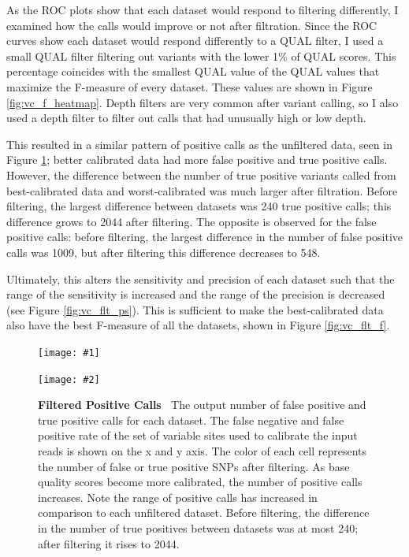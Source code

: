 \documentclass{report}
\newcommand{\titlecaption}[2]{\caption[#1]{\textbf{#1 \textbar\,} #2}}
\newcommand{\includetwo}[2]{\begin{minipage}{.475\textwidth}%
\texttt{[image: \#1]}%
\end{minipage}\hfill\begin{minipage}{.475\textwidth}%
\texttt{[image: \#2]}%
\end{minipage}}
\begin{document}
\begin{outline}
\item As the ROC plots show that each dataset would respond to filtering differently, I examined how the calls would improve or not after filtration. Since the ROC curves show each dataset would respond differently to a QUAL filter, I used a small QUAL filter filtering out variants with the lower 1\% of QUAL scores. This percentage coincides with the smallest QUAL value of the QUAL values that maximize the F-measure of every dataset. These values are shown in Figure \ref{fig:vc_f_heatmap}. Depth filters are very common after variant calling, so I also used a depth filter to filter out calls that had unusually high or low depth.
\item This resulted in a similar pattern of positive calls as the unfiltered data, seen in Figure \ref{fig:vc_flt_p}; better calibrated data had more false positive and true positive calls. However, the difference between the number of true positive variants called from best-calibrated data and worst-calibrated was much larger after filtration. Before filtering, the largest difference between datasets was 240 true positive calls; this difference grows to 2044 after filtering. The opposite is observed for the false positive calls: before filtering, the largest difference in the number of false positive calls was 1009, but after filtering this difference decreases to 548. 
\item Ultimately, this alters the sensitivity and precision of each dataset such that the range of the sensitivity is increased and the range of the precision is decreased (see Figure \ref{fig:vc_flt_ps}). This is sufficient to make the best-calibrated data also have the best F-measure of all the datasets, shown in Figure \ref{fig:vc_flt_f}.
\end{outline}

\begin{figure}
\centering
\includetwo{flt_fp_heatmap.pdf}{flt_tp_heatmap.pdf}
\titlecaption{Filtered Positive Calls}{The output number of false positive and true positive calls for each dataset. The false negative and false positive rate of the set of variable sites used to calibrate the input reads is shown on the x and y axis. The color of each cell represents the number of false or true positive SNPs after filtering. As base quality scores become more calibrated, the number of positive calls increases. Note the range of positive calls has increased in comparison to each unfiltered dataset. Before filtering, the difference in the number of true positives between datasets was at most 240; after filtering it rises to 2044.}
\label{fig:vc_flt_p}
\end{figure}
\end{document}
